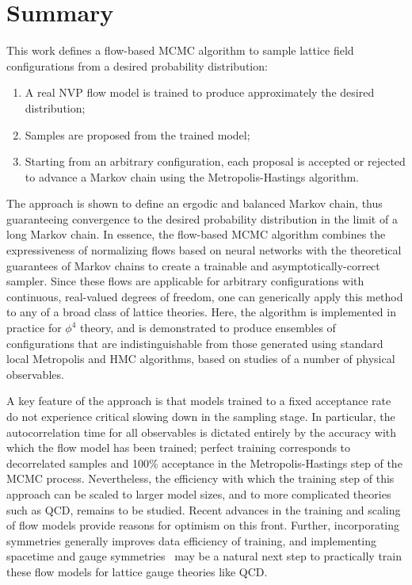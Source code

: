 \section{Summary}
\label{sec:summary}

This work defines a flow-based MCMC algorithm to sample lattice field configurations from a desired probability distribution:
\begin{enumerate}
    \item A real NVP flow model is trained to produce approximately the desired distribution;
    \item Samples are proposed from the trained model;
    \item Starting from an arbitrary configuration, each proposal is accepted or rejected to advance a Markov chain using the Metropolis-Hastings algorithm.
\end{enumerate}
The approach is shown to define an ergodic and balanced Markov chain, thus guaranteeing convergence to the desired probability distribution in the limit of a long Markov chain. In essence, the flow-based MCMC algorithm combines the expressiveness of normalizing flows based on neural networks with the theoretical guarantees of Markov chains to create a trainable and asymptotically-correct sampler. Since these flows are applicable for arbitrary configurations with continuous, real-valued degrees of freedom, one can generically apply this method to any of a broad class of lattice theories. Here, the algorithm is implemented in practice for $\phi^4$ theory, and is demonstrated to produce ensembles of configurations that are indistinguishable from those generated using standard local Metropolis and HMC algorithms, based on studies of a number of physical observables.

A key feature of the approach is that models trained to a fixed acceptance rate do not experience critical slowing down in the sampling stage. In particular, the autocorrelation time for all observables is dictated entirely by the accuracy with which the flow model has been trained; perfect training corresponds to decorrelated samples and 100\% acceptance in the Metropolis-Hastings step of the MCMC process. Nevertheless, the efficiency with which the training step of this approach can be scaled to larger model sizes, and to more complicated theories such as QCD, remains to be studied. Recent advances in the training and scaling of flow models provide reasons for optimism on this front. Further, incorporating symmetries generally improves data efficiency of training, and implementing spacetime and gauge symmetries~\cite{Cohen2019GaugeEquiv} may be a natural next step to practically train these flow models for lattice gauge theories like QCD.

